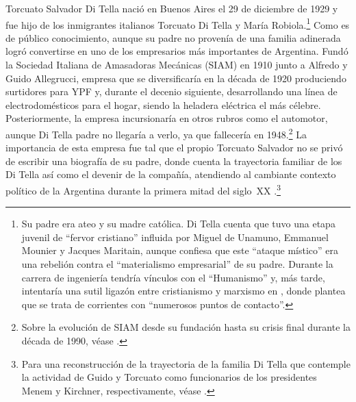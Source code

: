 Torcuato Salvador Di Tella nació en Buenos Aires el 29 de diciembre de 1929 y fue hijo de los inmigrantes italianos Torcuato Di Tella y María Robiola.\footnote{Su padre era ateo y su madre católica. Di Tella cuenta que tuvo una etapa juvenil de \enquote{fervor cristiano} \parencite[264]{1553-CAMOU2009} influida por Miguel de Unamuno, Emmanuel Mounier y Jacques Maritain, aunque confiesa que este \enquote{ataque místico} era una rebelión contra el \enquote{materialismo empresarial} de su padre. Durante la carrera de ingeniería tendría vínculos con el \enquote{Humanismo} y, más tarde, intentaría una sutil ligazón entre cristianismo y marxismo en  \parencite*[10]{1657-DITELLA1965}, donde plantea que se trata de corrientes con \enquote{numerosos puntos de contacto}.} Como es de público conocimiento, aunque su padre no provenía de una familia adinerada logró convertirse en uno de los empresarios más importantes de Argentina. Fundó la Sociedad Italiana de Amasadoras Mecánicas (SIAM) en 1910 junto a Alfredo y Guido Allegrucci, empresa que se diversificaría en la década de 1920 produciendo surtidores para YPF y, durante el decenio siguiente, desarrollando una línea de electrodomésticos para el hogar, siendo la heladera eléctrica el más célebre. Posteriormente, la empresa incursionaría en otros rubros como el automotor, aunque Di Tella padre no llegaría a verlo, ya que fallecería en 1948.\footnote{Sobre la evolución de SIAM desde su fundación hasta su crisis final durante la década de 1990, véase \textcite{1583-COCHRAN2016}.} La importancia de esta empresa fue tal que el propio Torcuato Salvador no se privó de escribir una biografía de su padre, donde cuenta la trayectoria familiar de los Di Tella así como el devenir de la compañía, atendiendo al cambiante contexto político de la Argentina durante la primera mitad del siglo~XX \parencite{1652-DITELLA1993}.\footnote{Para una reconstrucción de la trayectoria de la familia Di Tella que contemple la actividad de Guido y Torcuato como funcionarios de los presidentes Menem y Kirchner, respectivamente, véase \textcite{1448-CASSESE2008}.}

